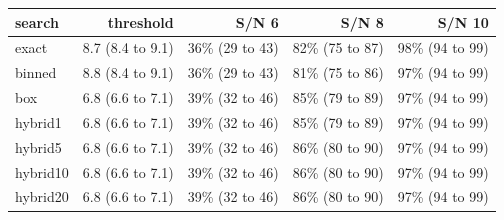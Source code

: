 \begin{tabular}{lrrrr}
\toprule
search & threshold & S/N 6 & S/N 8 & S/N 10 \\
\midrule
exact & 8.7 (8.4 to 9.1) & 36\% (29 to 43) & 82\% (75 to 87) & 98\% (94 to 99) \\
binned & 8.8 (8.4 to 9.1) & 36\% (29 to 43) & 81\% (75 to 86) & 97\% (94 to 99) \\
box & 6.8 (6.6 to 7.1) & 39\% (32 to 46) & 85\% (79 to 89) & 97\% (94 to 99) \\
hybrid1 & 6.8 (6.6 to 7.1) & 39\% (32 to 46) & 85\% (79 to 89) & 97\% (94 to 99) \\
hybrid5 & 6.8 (6.6 to 7.1) & 39\% (32 to 46) & 86\% (80 to 90) & 97\% (94 to 99) \\
hybrid10 & 6.8 (6.6 to 7.1) & 39\% (32 to 46) & 86\% (80 to 90) & 97\% (94 to 99) \\
hybrid20 & 6.8 (6.6 to 7.1) & 39\% (32 to 46) & 86\% (80 to 90) & 97\% (94 to 99) \\
\bottomrule
\end{tabular}
